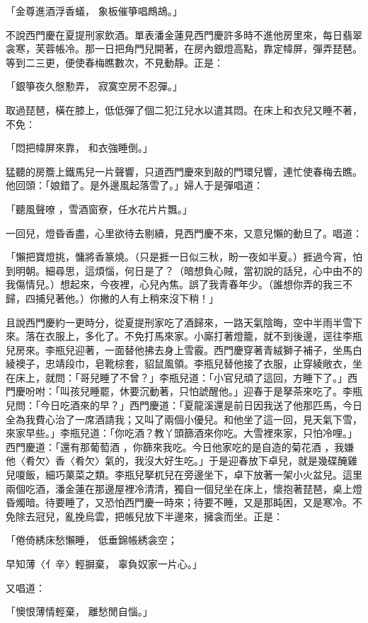 \begin{showcontents}{}
「金尊進酒浮香蟻，  象板催箏唱鷓鴣。」

不說西門慶在夏提刑家飲酒。單表潘金蓮見西門慶許多時不進他房里來，每日翡翠衾寒，芙蓉帳冷。那一日把角門兒開著，在房內銀燈高點，靠定幃屏，彈弄琵琶。等到二三更，便使春梅瞧數次，不見動靜。正是：

「銀箏夜久慇懃弄，  寂寞空房不忍彈。」

取過琵琶，橫在膝上，低低彈了個二犯江兒水以遣其悶。在床上和衣兒又睡不著，不免：

「悶把幃屏來靠，  和衣強睡倒。」

猛聽的房簷上鐵馬兒一片聲響，只道西門慶來到敲的門環兒響，連忙使春梅去瞧。他回頭：「娘錯了。是外邊風起落雪了。」婦人于是彈唱道：

「聽風聲嘹 ，雪酒窗寮，任水花片片飄。」

一回兒，燈昏香盡，心里欲待去剔續，見西門慶不來，又意兒懶的動旦了。唱道：

「懶把寶燈挑，慵將香篆燒。（只是捱一日似三秋，盼一夜如半夏。）捱過今宵，怕到明朝。細尋思，這煩惱，何日是了？（暗想負心賊，當初說的話兒，心中由不的我傷情兒。）想起來，今夜裡，心兒內焦。誤了我青春年少。（誰想你弄的我三不歸，四捕兒著他。）你撇的人有上稍來沒下稍！」

且說西門慶約一更時分，從夏提刑家吃了酒歸來，一路天氣陰晦，空中半雨半雪下來。落在衣服上，多化了。不免打馬來家。小廝打著燈籠，就不到後邊，逕往李瓶兒房來。李瓶兒迎著，一面替他拂去身上雪霰。西門慶穿著青絨獅子補子，坐馬白綾襖子，忠靖段巾，皂靴棕套，貂鼠風領。李瓶兒替他接了衣服，止穿綾敞衣，坐在床上，就問：「哥兒睡了不曾？」李瓶兒道：「小官兒頑了這回，方睡下了。」西門慶吩咐：「叫孩兒睡罷，休要沉動著，只怕諕醒他。」迎春于是拏茶來吃了。李瓶兒問：「今日吃酒來的早？」西門慶道：「夏龍溪還是前日因我送了他那匹馬，今日全為我費心治了一席酒請我；又叫了兩個小優兒。和他坐了這一回，見天氣下雪，來家早些。」李瓶兒道：「你吃酒？教丫頭篩酒來你吃。大雪裡來家，只怕冷哩。」西門慶道：「還有那葡萄酒 ，你篩來我吃。今日他家吃的是自造的菊花酒 ，我嫌他〈肴欠〉香〈肴欠〉氣的，我沒大好生吃。」于是迎春放下卓兒，就是幾碟醃雞兒嗄飯，細巧菓菜之類。李瓶兒拏杌兒在旁邊坐下，卓下放著一架小火盆兒。這里兩個吃酒，潘金蓮在那邊屋裡冷清清，獨自一個兒坐在床上，懷抱著琵琶，桌上燈昏燭暗。待要睡了，又恐怕西門慶一時來；待要不睡，又是那盹困，又是寒冷。不免除去冠兒，亂挽烏雲，把帳兒放下半邊來，擁衾而坐。正是：

「倦倚綉床愁懶睡，  低垂錦帳綉衾空；

早知薄〈亻辛〉輕摒棄，  辜負奴家一片心。」

又唱道：

「懊恨薄情輕棄，  離愁閒自惱。」


\end{showcontents}
